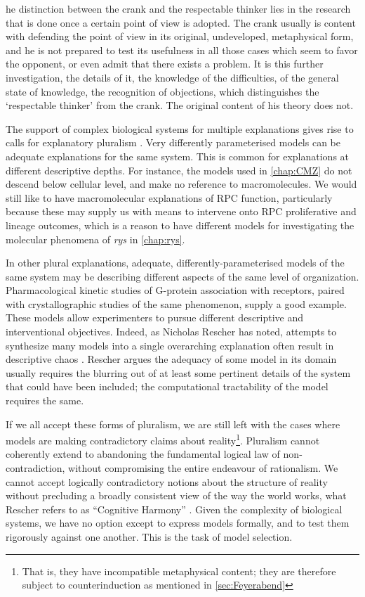 \begin{longquote}
[T]he distinction between the crank and the respectable thinker lies in the research that is done once a certain point of view is adopted. The crank usually is content with defending the point of view in its original, undeveloped, metaphysical form, and he is not prepared to test its usefulness in all those cases which seem to favor the opponent, or even admit that there exists a problem. It is this further investigation, the details of it, the knowledge of the difficulties, of the general state of knowledge, the recognition of objections, which distinguishes the ‘respectable thinker’ from the crank. The original content of his theory does not.
\cite[p.199]{Feyerabend1981}
\end{longquote}

The support of complex biological systems for multiple explanations gives rise to calls for explanatory pluralism \cite{Brigandt2010}. Very differently parameterised models can be adequate explanations for the same system. This is common for explanations at different descriptive depths. For instance, the models used in \autoref{chap:CMZ} do not descend below cellular level, and make no reference to macromolecules. We would still like to have macromolecular explanations of RPC function, particularly because these may supply us with means to intervene onto RPC proliferative and lineage outcomes, which is a reason to have different models for investigating the molecular phenomena of \textit{rys} in \autoref{chap:rys}.

In other plural explanations, adequate, differently-parameterised models of the same system may be describing different aspects of the same level of organization. Pharmacological kinetic studies of G-protein association with receptors, paired with crystallographic studies of the same phenomenon, supply a good example. These models allow experimenters to pursue different descriptive and interventional objectives. Indeed, as Nicholas Rescher has noted, attempts to synthesize many models into a single overarching explanation often result in descriptive chaos \cite[p.65-6]{Rescher2000}. Rescher argues the adequacy of some model in its domain usually requires the blurring out of at least some pertinent details of the system that could have been included; the computational tractability of the model requires the same.

If we all accept these forms of pluralism, we are still left with the cases where models are making contradictory claims about reality\footnote{That is, they have incompatible metaphysical content; they are therefore subject to counterinduction as mentioned in \autoref{sec:Feyerabend}}. Pluralism cannot coherently extend to abandoning the fundamental logical law of non-contradiction, without compromising the entire endeavour of rationalism. We cannot accept logically contradictory notions about the structure of reality without precluding a broadly consistent view of the way the world works, what Rescher refers to as ``Cognitive Harmony'' \cite{Rescher2005}. Given the complexity of biological systems, we have no option except to express models formally, and to test them rigorously against one another. This is the task of model selection.

